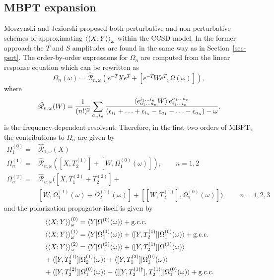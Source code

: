 \documentclass[preprint,12pt]{elsarticle}
\newcommand{\resn}[1]{\mathscr{\hat{R}}_{{#1},\omega}}
\newcommand{\op}[3]{{#1}_{#2}^{(#3)}}
\newcommand{\equl}[2]{\begin{equation}\label{#2} #1 \end{equation}}
\newcommand{\equal}[2]{\begin{align}\label{#2} #1 \end{align}}
\newcommand{\fr}[1]{Eq.~(\ref{#1})}
\newcommand{\frs}[1]{Section~\ref{#1}}
\newcommand{\odpr}[1]{\braket{\braket{X;Y}}_\omega^{(#1)}}
\newcommand{\odp}{\braket{\braket{X;Y}}_\omega}
\newcommand{\etm}{e^{-T}}
\newcommand{\et}{e^{T}}
\begin{document}
\subsection{MBPT expansion}
Moszynski and Jeziorski\cite{moszynski2005time} proposed both perturbative and
non-perturbative schemes of approximating  $\odp$ 
within the CCSD model.
  In the former approach  the 
  $T$ and $S$ amplitudes are found in the same way as in \frs{sec-pert}. The order-by-order
  expressions for $\Omega_n$ are computed from the linear response equation 
  which can be rewritten as
\equl{\Omega_n(\omega) = \hat{\mathscr{R}}_{n,\omega}(\etm X\et + [\etm W\et, \Omega(\omega)]),
}{om-rzedy}
where
\equl{\resn{n}(W) = \frac{1}{(n!)^2}\sum_{a_ni_n}\frac{\braket{e^{i_1\ldots i_n}_{a_1\ldots a_n}W}e_{i_1\ldots i_n}^{a_1\ldots a_n}}
  {(\epsilon_{i_1}+  \ldots + \epsilon_{i_n} -\epsilon_{a_1}-\ldots -\epsilon_{a_n})-\omega}.
}{res2}
is the frequency-dependent resolvent.
Therefore, in the first two orders of MBPT, the contributions to  $\Omega_n$ are given by 
\equal{\Omega_1^{(0)} = &\resn{1}(X)\\
  \Omega_n^{(1)} = &\resn{n}([X,T_2^{(1)}] + [W, \Omega_1^{(0)}(\omega)]), \qquad n=1, 2\nonumber\\
  \Omega_n^{(2)} = &\resn{n}([X,T_1^{(2)} + T_2^{(2)}] + \nonumber\\
  &[W, \Omega_1^{(1)}(\omega)+ \Omega_2^{(1)}(\omega)]
  +[[W, T_2^{(1)}], \Omega_1^{(0)}(\omega)]
  ), \qquad n=1, 2, 3\nonumber
}{pp1}
and the polarization propagator itself is given by
\equal{&\odpr{0} = \braket{Y|\Omega^{(0)}(\omega)}+ \mbox{g.c.c.}\\
  &\odpr{1} = \braket{Y|\op{\Omega}{1}{1}(\omega)} + \braket{[Y,\op{T}{2}{1}]|\op{\Omega}{1}{0}(\omega)}+ \mbox{g.c.c.}\nonumber\\
  &\odpr{2} = \braket{Y|\op{\Omega}{1}{2}(\omega)} + \braket{[Y,\op{T}{2}{1}]|\op{\Omega}{1}{1}(\omega)}\nonumber\\
  & + \braket{[Y,\op{T}{2}{1}]|\op{\Omega}{2}{1}(\omega)}+ \braket{[Y,\op{T}{1}{2}]|\op{\Omega}{1}{0}(\omega)}\nonumber\\
  &+ \braket{[Y,\op{T}{2}{2}]|\op{\Omega}{1}{0}(\omega)} - \braket{[[Y,T_2^{(1)\dagger}],\op{T}{2}{1}]|\op{\Omega}{1}{0}(\omega)} + \mbox{g.c.c.}\nonumber
}{pp2}
\end{document}
